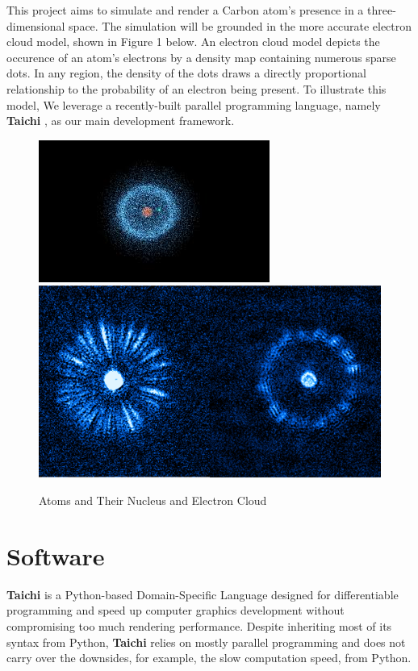 \documentclass[acmtog]{acmart}
\begin{document}
This project aims to simulate and render a Carbon atom's presence in a three-dimensional space. The simulation will be grounded in the more accurate electron cloud model, shown in Figure 1 below. An electron cloud model depicts the occurence of an atom's electrons by a density map containing numerous sparse dots. In any region, the density of the dots draws a directly proportional relationship to the probability of an electron being present. To illustrate this model, We leverage a recently-built parallel programming language, namely \textbf{Taichi} \cite{hu2019taichi}, as our main development framework.

\begin{figure}[h]
  \centering
  \includegraphics[width=\linewidth]{./concept_1.jpeg}
  \includegraphics[width=\linewidth]{./concept_2.png}
  \caption{Atoms and Their Nucleus and Electron Cloud}
\end{figure}

\section{Software}
\textbf{Taichi} is a Python-based Domain-Specific Language designed for differentiable programming and speed up computer graphics development without compromising too much rendering performance. Despite inheriting most of its syntax from Python, \textbf{Taichi} relies on mostly parallel programming and does not carry over the downsides, for example, the slow computation speed, from Python.
\end{document}

